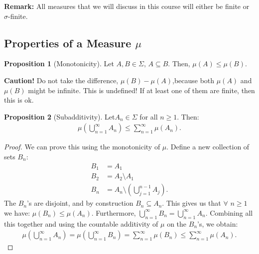 \documentclass[11pt]{article}
\theoremstyle{definition}
\newtheorem{prop}{Proposition}[section]
\theoremstyle{theorem}
\begin{document}
\textbf{Remark:} All measures that we will discuss in this course will either be finite or \( \sigma \)-finite. 

\subsection{Properties of a Measure \( \mu \)}
\begin{prop}[Monotonicity]
	Let \( A, B \in \Sigma \), \( A \subseteq B \). Then, \( \mu(A) \leq \mu(B) \).  
\end{prop}
\textbf{Caution!} Do not take the difference, \( \mu(B) - \mu(A) \),because both \( \mu(A) \) and \( \mu(B) \) might be infinite. This is undefined! If at least one of them are finite, then this is ok. 
\begin{prop}[Subadditivity]
	Let\( A_n \in \Sigma \) for all \( n \geq 1 \). Then:
	\begin{align}
		\mu \left( \bigcup_{n=1}^\infty A_n \right) \leq \sum_{n=1}^\infty \mu(A_n).
	\end{align}
\end{prop}
\begin{proof}
	We can prove this using the monotonicity of \( \mu \). Define a new collection of sets \( B_n \):
	\begin{align*}
		B_1 & = A_1 \\
		B_2 & = A_2 \setminus A_1 \\
		B_n & = A_n \setminus \left( \bigcup_{j=1}^{n-1} A_j \right). 
	\end{align*}
	The \( B_n \)'s are disjoint, and by construction \( B_n \subseteq A_n \). This gives us that \( \forall \) \( n \geq 1 \) we have: \( \mu(B_n) \leq \mu (A_n) \). Furthermore, \( \bigcup_{n=1}^\infty B_n = \bigcup_{n=1}^\infty A_n \). Combining all this together and using the countable additivity of \( \mu \) on the \( B_n \)'s, we obtain:
	\begin{align*}
		\mu \left( \bigcup_{n=1}^\infty A_n \right)	= \mu \left( \bigcup_{n=1}^\infty B_n \right) = \sum_{n=1}^\infty \mu(B_n) \leq \sum_{n=1}^\infty \mu(A_n).
	\end{align*}
\end{proof}
\end{document}
